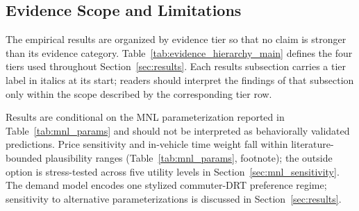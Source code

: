 \subsection{Evidence Scope and Limitations}
\label{sec:evidence_scope}

The empirical results are organized by evidence tier so that no claim is stronger than its evidence category. Table~\ref{tab:evidence_hierarchy_main} defines the four tiers used throughout Section~\ref{sec:results}. Each results subsection carries a tier label in italics at its start; readers should interpret the findings of that subsection only within the scope described by the corresponding tier row.

\begin{table}[t]
\centering
\small
\setlength{\tabcolsep}{3pt}
\caption{Evidence hierarchy used to interpret the empirical results. The table separates evidence tiers so that no claim is stronger than its evidence category.}
\label{tab:evidence_hierarchy_main}
\end{table}

Results are conditional on the MNL parameterization reported in Table~\ref{tab:mnl_params} and should not be interpreted as behaviorally validated predictions. Price sensitivity and in-vehicle time weight fall within literature-bounded plausibility ranges (Table~\ref{tab:mnl_params}, footnote); the outside option is stress-tested across five utility levels in Section~\ref{sec:mnl_sensitivity}. The demand model encodes one stylized commuter-DRT preference regime; sensitivity to alternative parameterizations is discussed in Section~\ref{sec:results}.
